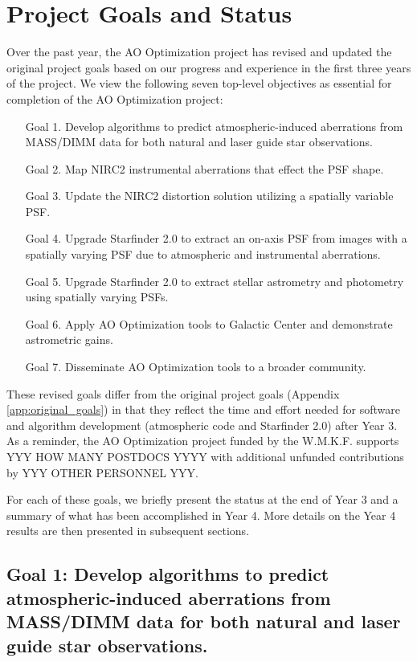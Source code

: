 \section{Project Goals and Status}
\label{sec:overview}

Over the past year, the AO Optimization project has revised and
updated the original project goals based on our progress and
experience in the first three years of the project. We view the
following seven top-level objectives as essential for completion of
the AO Optimization project:
\begin{enumerate}
\item[Goal 1.] Develop algorithms to predict atmospheric-induced aberrations
  from MASS/DIMM data for both natural and laser guide star observations.
\item[Goal 2.] Map NIRC2 instrumental aberrations that effect the PSF shape.
\item[Goal 3.] Update the NIRC2 distortion solution utilizing a spatially
  variable PSF.
\item[Goal 4.] Upgrade Starfinder 2.0 to extract an on-axis PSF from images with
  a spatially varying PSF due to atmospheric and instrumental aberrations.
\item[Goal 5.] Upgrade Starfinder 2.0 to extract stellar astrometry and
  photometry using spatially varying PSFs.
\item[Goal 6.] Apply AO Optimization tools to Galactic Center and demonstrate
  astrometric gains.
\item[Goal 7.] Disseminate AO Optimization tools to a broader community.
\end{enumerate}
These revised goals differ from the original project goals 
(Appendix \ref{app:original_goals}) in that
they reflect the time and effort needed for software and
algorithm development (atmospheric code and Starfinder 2.0) after Year
3. As a reminder, the AO Optimization project funded by the
W.M.K.F. supports YYY HOW MANY POSTDOCS YYYY with additional unfunded 
contributions by YYY OTHER PERSONNEL YYY. 

For each of these goals, we briefly present the status at the end of
Year 3 and a summary of what has been accomplished in Year 4. More
details on the Year 4 results are then presented in subsequent
sections.


\subsection{Goal 1: Develop algorithms to predict atmospheric-induced aberrations
  from MASS/DIMM data for both natural and laser guide star observations.}

